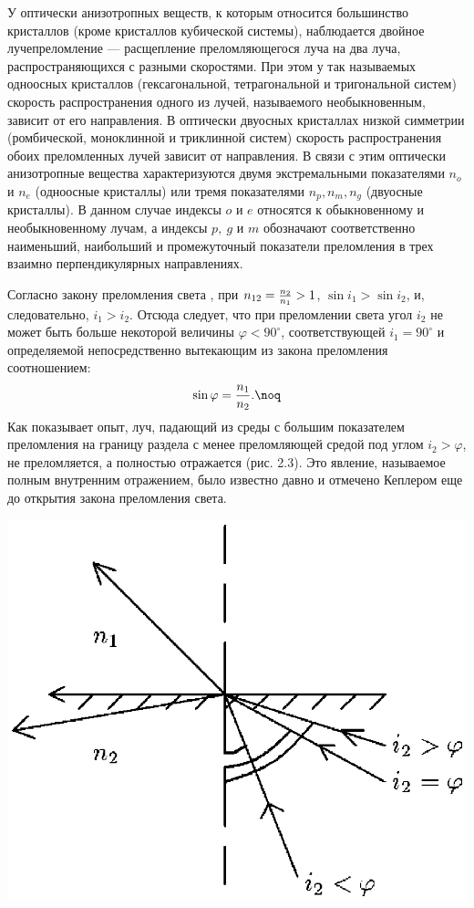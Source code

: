 У оптически анизотропных веществ, к которым относится большинство
кристаллов (кроме кристаллов кубической системы), наблюдается
двойное лучепреломление --- расщепление преломляющегося луча на
два луча, распространяющихся с разными скоростями. При этом у так
называемых одноосных кристаллов (гексагональной, тетрагональной и
тригональной систем) скорость распространения одного из лучей,
называемого необыкновенным, зависит от его направления. В
оптически двуосных кристаллах низкой симметрии (ромбической,
моноклинной и триклинной систем) скорость распространения обоих
преломленных лучей зависит от направления. В связи с этим
оптически анизотропные вещества характеризуются двумя
экстремальными показателями $n_{o}$ и $n_{e}$ (одноосные
кристаллы) или тремя показателями $n_p,n_m,n_g$ (двуосные
кристаллы). В данном случае индексы $o$ и $e$ относятся к
обыкновенному и необыкновенному лучам, а индексы $p,\ g$ и $m$
обозначают соответственно наименьший, наибольший и промежуточный
показатели преломления в трех взаимно перпендикулярных
направлениях.

Согласно закону преломления света , при $n_{12}={n_2\over
n_1}>1$, $\sin i_1>\sin i_2$, и, следовательно, $i_1>i_2$. Отсюда
следует, что при преломлении света угол $i_2$ не может быть больше
некоторой величины $\varphi<90^{\circ}$, соответствующей
$i_1=90^{\circ}$ и определяемой непосредственно вытекающим из
закона преломления соотношением:
$$\sin\varphi={n_1\over n_2}.\noq$$
Как показывает опыт, луч, падающий из среды с большим показателем
преломления на границу раздела с менее преломляющей средой под
углом $i_2>\varphi$, не преломляется, а полностью отражается (рис.
2.3). Это явление, называемое полным внутренним отражением, было
известно давно и отмечено Кеплером еще до открытия закона
преломления света.

\vskip 3mm
\centerline{\hbox{\includegraphics[scale=0.7]{Ris/ris_eps/ris2_03.eps}}}

